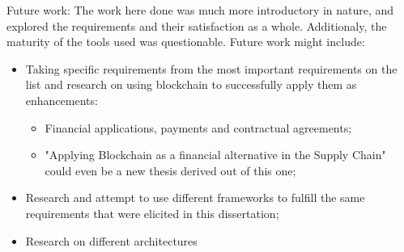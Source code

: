 Future work: The work here done was much more introductory in nature, and explored the requirements and their satisfaction as a whole. Additionaly, the maturity of the tools used was questionable. 
Future work might include:
\begin{itemize}
	\item Taking specific requirements from the most important requirements on the list and research on using blockchain to successfully apply them as enhancements:
	\begin{itemize}
		\item Financial applications, payments and contractual agreements;
		\item "Applying Blockchain as a financial alternative in the Supply Chain" could even be a new thesis derived out of this one;
	\end{itemize}
	\item Research and attempt to use different frameworks to fulfill the same requirements that were elicited in this dissertation;
    \item Research on different architectures
\end{itemize} 


%

